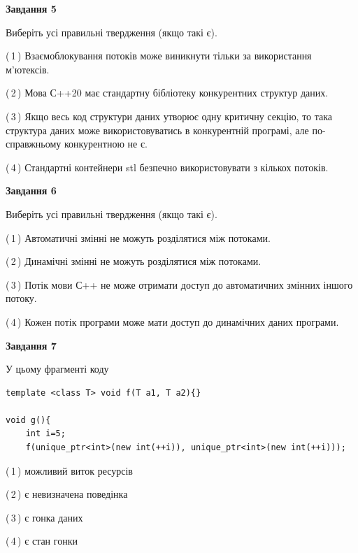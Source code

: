 \documentclass[12pt, ukrainian]{article}
\begin{document}
\begin {large}
{\begin{center}
\textbf{Завдання 5}
\end{center}

Виберіть усі правильні твердження (якщо такі є).\par
\vspace{2mm}

(\,1\,) Взаємоблокування потоків може виникнути тільки за використання м’ютексів.%

(\,2\,) Мова С++20 має стандартну бібліотеку конкурентних структур даних.%

(\,3\,) Якщо весь код структури даних утворює одну критичну секцію, то така структура даних може використовуватись в конкурентній програмі, але по-справжньо\-му конкурентною не є.%

(\,4\,) Стандартні контейнери stl безпечно використовувати з кількох потоків.%
\newpage


\begin{center}
\textbf{Завдання 6}
\end{center}

Виберіть усі правильні твердження (якщо такі є).\par
\vspace{2mm}

(\,1\,) Автоматичні змінні не можуть розділятися між потоками.%

(\,2\,) Динамічні змінні не можуть розділятися між потоками.%

(\,3\,) Потік мови С++ не може отримати доступ до автоматичних змінних іншого потоку.%

(\,4\,) Кожен потік програми може мати доступ до динамічних даних програми.%


\begin{center}
\textbf{Завдання 7}
\end{center}

У цьому фрагменті коду
\begin{verbatim}
template <class T> void f(T a1, T a2){}

void g(){
    int i=5;
    f(unique_ptr<int>(new int(++i)), unique_ptr<int>(new int(++i)));
\end{verbatim}

(\,1\,) можливий виток ресурсів%

(\,2\,) є невизначена поведінка%

(\,3\,) є гонка даних%

(\,4\,) є стан гонки%

}
\end {large}

\vspace{4mm}
\newpage
\end{document}
